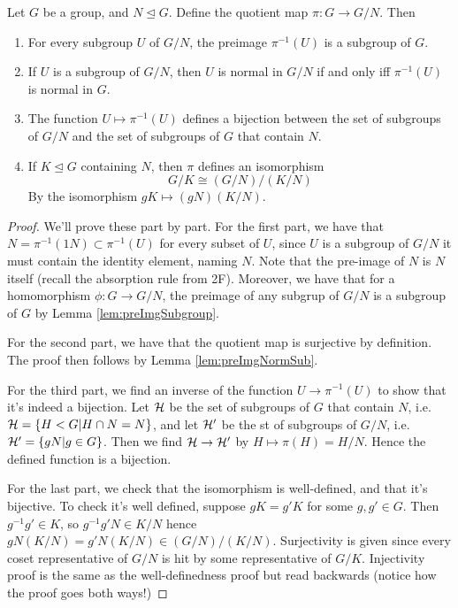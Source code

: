 \begin{theorem}
  Let $G$ be a group, and $N\trianglelefteq G$. Define the quotient map $\pi:G\to G/N$.
  Then
  \begin{enumerate}
    \item For every subgroup $U$ of $G/N$, the preimage $\pi^{-1}(U)$ is a subgroup of
      $G$.
    \item If $U$ is a subgroup of $G/N$, then $U$ is normal in $G/N$ if and only iff
      $\pi^{-1}(U)$ is normal in $G$.
    \item The function $U\mapsto\pi^{-1}(U)$ defines a bijection between the set of
      subgroups of $G/N$ and the set of subgroups of $G$ that contain $N$.
    \item If $K\trianglelefteq G$ containing $N$, then $\pi$ defines an isomorphism
      \[G/K \cong (G/N)/(K/N)\]
      By the isomorphism $gK\mapsto (gN)(K/N)$.
  \end{enumerate}
  \label{thm:tit}
\end{theorem}
\begin{proof}
  We'll prove these part by part. For the first part, we have that
  $N=\pi^{-1}(1N)\subset\pi^{-1}(U)$ for every subset of $U$, since $U$ is a subgroup of
  $G/N$ it must contain the identity element, naming $N$. Note that the pre-image of $N$
  is $N$ itself (recall the absorption rule from 2F). Moreover, we have that for a
  homomorphism $\phi:G\to G/N$, the preimage of any subgrup of $G/N$ is a subgroup of $G$
  by Lemma \ref{lem:preImgSubgroup}.

  For the second part, we have that the quotient map is surjective by definition. The
  proof then follows by Lemma \ref{lem:preImgNormSub}.

  For the third part, we find an inverse of the function $U\to \pi^{-1}(U)$ to show that
  it's indeed a bijection. Let $\mathcal H$ be the set of subgroups of $G$ that contain $N$, i.e.
  $\mathcal H=\{H<G | H\cap N = N\}$, and let $\mathcal H'$ be the st of subgroups of $G/N$, i.e.
  $\mathcal H'=\{gN | g\in G\}$. Then we find $\mathcal H\to\mathcal H'$ by $H\mapsto \pi (H)=H/N$. Hence the
  defined function is a bijection.

  For the last part, we check that the isomorphism is well-defined, and that it's
  bijective. To check it's well defined, suppose $gK=g'K$ for some $g,g'\in G$. Then
  $g^{-1}g'\in K$, so $g^{-1}g' N \in K/N$ hence $gN(K/N) = g'N(K/N)\in (G/N)/(K/N)$.
  Surjectivity is given since every coset representative of $G/N$ is hit by some
  representative of $G/K$. Injectivity proof is the same as the well-definedness proof but
  read backwards (notice how the proof goes both ways!)

\end{proof}

